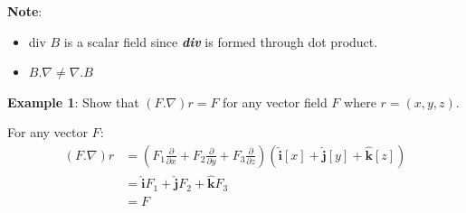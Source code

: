 \documentclass[10pt,a4paper]{article}
\begin{document}
\textbf{Note}: 
\begin{itemize}
    \item div $B$ is a scalar field since \textbf{\textit{div}} is formed through dot product.
    \item $B.\nabla \neq \nabla.B$
\end{itemize}

\textbf{Example 1}: Show that $(F.\nabla)r=F$ for any vector field $F$ where $r=(x,y,z)$.

For any vector $F$: 
\begin{align*}
    (F.\nabla)r &= \left(F_1 \frac{\partial}{\partial x} + F_2\frac{\partial}{\partial y} + F_3\frac{\partial}{\partial z}\right)\left(\hat{\textbf{i}}[x]+\hat{\textbf{j}}[y]+\hat{\textbf{k}}[z]\right) \\
    &= \hat{\textbf{i}}F_1 + \hat{\textbf{j}}F_2 + \hat{\textbf{k}}F_3 \\
    &= F
\end{align*}
\end{document}
